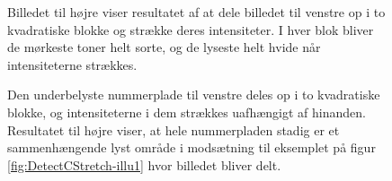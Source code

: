 \begin{figure}[htbp]
  \centering
  \begin{minipage}[b]{5 cm}
  \end{minipage}
  \begin{minipage}[b]{5 cm}
  \end{minipage}
  \caption{Billedet til højre viser resultatet af at dele billedet til venstre op i to kvadratiske blokke og strække deres intensiteter. I hver blok bliver de mørkeste toner helt sorte, og de lyseste helt hvide når intensiteterne strækkes.}
  \label{fig:DetectCStretch-illu1}
\end{figure}

\begin{figure}[htbp]
  \centering
  \begin{minipage}[b]{5 cm}
  \end{minipage}
  \begin{minipage}[b]{5 cm}
  \end{minipage}
  \caption{Den underbelyste nummerplade til venstre deles op i to kvadratiske blokke, og intensiteterne i dem strækkes uafhængigt af hinanden. Resultatet til højre viser, at hele nummerpladen stadig er et sammenhængende lyst område i modsætning til eksemplet på figur \vref{fig:DetectCStretch-illu1} hvor billedet bliver delt.}
  \label{fig:DetectCStretch-illu2}
\end{figure}

